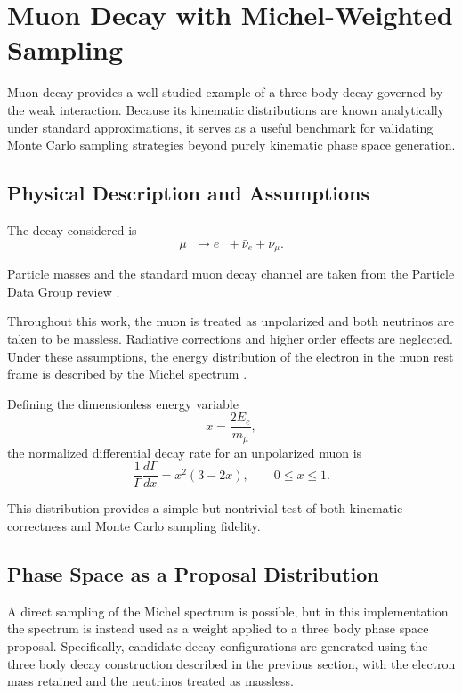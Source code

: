 \documentclass[11pt,a4paper]{article}
\begin{document}
\section{Muon Decay with Michel-Weighted Sampling}
\label{sec:muon}

Muon decay provides a well studied example of a three body decay governed by the weak
interaction. Because its kinematic distributions are known analytically under standard
approximations, it serves as a useful benchmark for validating Monte Carlo sampling
strategies beyond purely kinematic phase space generation.

\subsection{Physical Description and Assumptions}

The decay considered is
\begin{equation}
\mu^- \rightarrow e^- + \bar{\nu}_e + \nu_\mu .
\end{equation}

Particle masses and the standard muon decay channel are taken from the Particle Data Group
review \cite{pdg2024}.

Throughout this work, the muon is treated as unpolarized and both neutrinos are taken to
be massless. Radiative corrections and higher order effects are neglected. Under these
assumptions, the energy distribution of the electron in the muon rest frame is described
by the Michel spectrum \cite{michel1950}.

Defining the dimensionless energy variable
\begin{equation}
x = \frac{2 E_e}{m_\mu} ,
\end{equation}
the normalized differential decay rate for an unpolarized muon is
\begin{equation}
\frac{1}{\Gamma} \frac{d\Gamma}{dx} = x^2 (3 - 2x),
\qquad 0 \le x \le 1 .
\end{equation}

This distribution provides a simple but nontrivial test of both kinematic correctness
and Monte Carlo sampling fidelity.

\subsection{Phase Space as a Proposal Distribution}

A direct sampling of the Michel spectrum is possible, but in this implementation the
spectrum is instead used as a weight applied to a three body phase space proposal.
Specifically, candidate decay configurations are generated using the three body decay
construction described in the previous section, with the electron mass retained and the
neutrinos treated as massless.
\end{document}
